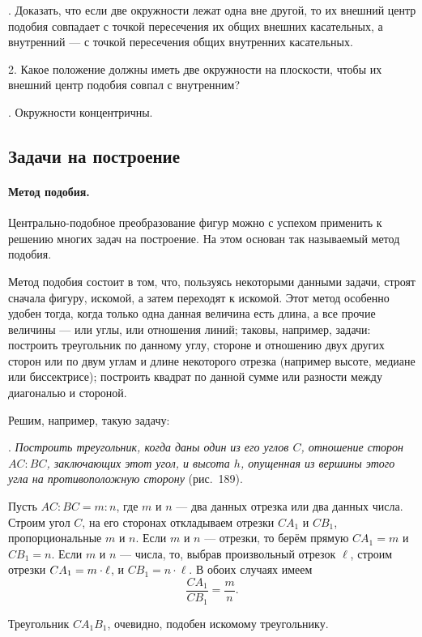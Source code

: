 \smallskip
{}.
Доказать, что если две окружности лежат одна вне другой, то их внешний центр подобия совпадает с точкой пересечения их общих внешних касательных, а внутренний — с точкой пересечения общих внутренних касательных.

2.
Какое положение должны иметь две окружности на плоскости, чтобы их внешний центр подобия совпал с внутренним? 

\smallskip
{}.
Окружности концентричны.


\subsection*{Задачи на построение}

\paragraph{Метод подобия.}\label{1938/181}
Центрально-подобное преобразование фигур можно с успехом применить к решению многих задач на построение.
На этом основан так называемый метод подобия.

Метод подобия состоит в том, что, пользуясь некоторыми данными задачи, строят сначала фигуру,  искомой, а затем переходят к искомой.
Этот метод особенно удобен тогда, когда только одна данная величина есть длина, а все прочие величины — или углы, или отношения линий;
таковы, например, задачи:
построить треугольник по данному углу, стороне и отношению двух других сторон или по двум углам и длине некоторого отрезка (например высоте, медиане или биссектрисе);
построить квадрат по данной сумме или разности между диагональю и стороной.

Решим, например, такую задачу:

\smallskip
{}.
\emph{Построить треугольник, когда даны один из его углов $C$, отношение сторон $AC:BC$, заключающих этот угол, и высота $h$, опущенная из вершины этого угла на противоположную сторону} (рис.~189).

Пусть $AC:BC=m:n$, где $m$ и $n$ — два данных отрезка или два данных числа.
Строим угол $C$, на его сторонах откладываем отрезки $CA_1$ и $CB_1$, пропорциональные $m$ и $n$.
Если $m$ и $n$ — отрезки, то берём прямую $CA_1=m$ и $CB_1=n$.
Если $m$ и $n$ — числа, то, выбрав произвольный отрезок $\ell$, строим отрезки $CA_1\z=m \cdot \ell$, и $CB_1=n\cdot \ell$.
В обоих случаях имеем
\[\frac{CA_1}{CB_1} = \frac mn.\]

Треугольник $CA_1B_1$, очевидно, подобен искомому треугольнику.

